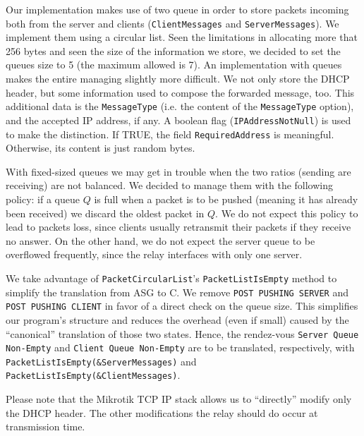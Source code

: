 Our implementation makes use of two queue in order to store packets incoming both from the server and clients (\texttt{ClientMessages} and \texttt{ServerMessages}). We implement them using a circular list. Seen the limitations in allocating more that 256 bytes and seen the size of the information we store, we decided to set the queues size to 5 (the maximum allowed is 7). An implementation with queues makes the entire managing slightly more difficult. We not only store the DHCP header, but some information used to compose the forwarded message, too. This additional data is the \texttt{MessageType} (i.e. the content of the \texttt{MessageType} option), and the accepted IP address, if any. A boolean flag (\texttt{IPAddressNotNull}) is used to make the distinction. If TRUE, the field \texttt{RequiredAddress} is meaningful. Otherwise, its content is just random bytes.

With fixed-sized queues we may get in trouble when the two ratios (sending are receiving) are not balanced. We decided to manage them with the following policy: if a queue $Q$ is full when a packet is to be pushed (meaning it has already been received) we discard the oldest packet in $Q$. We do not expect this policy to lead to packets loss, since clients usually retransmit their packets if they receive no answer. On the other hand, we do not expect the server queue to be overflowed frequently, since the relay interfaces with only one server. 

We take advantage of \texttt{PacketCircularList}'s \texttt{PacketListIsEmpty} method to simplify the translation from ASG to C. We remove \texttt{POST PUSHING SERVER} and \texttt{POST PUSHING CLIENT} in favor of a direct check on the queue size. This simplifies our program's structure and reduces the overhead (even if small) caused by the ``canonical'' translation of those two states. Hence, the rendez-vous \texttt{Server Queue Non-Empty} and \texttt{Client Queue Non-Empty} are to be translated, respectively, with \texttt{PacketListIsEmpty(\&ServerMessages)} and \\\texttt{PacketListIsEmpty(\&ClientMessages)}.

Please note that the Mikrotik TCP IP stack allows us to ``directly'' modify only the DHCP header. The other modifications the relay should do occur at transmission time.

